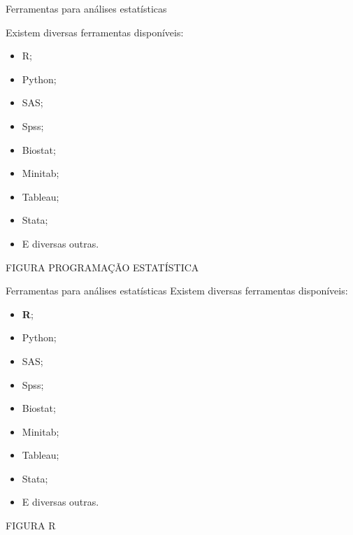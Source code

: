 \documentclass[
  ignorenonframetext,
  serif,
  professionalfont,
  usenames,
  dvipsnames,
  aspectratio = 169]{beamer}
\def\beginAHalfColumn{\begin{minipage}{0.49\textwidth}}%
\def\endColumns{\end{minipage}}%
\begin{document}
\begin{frame}{Ferramentas para análises estatísticas}
\protect\hypertarget{ferramentas-para-anuxe1lises-estatuxedsticas}{}
\beginAHalfColumn

Existem diversas ferramentas disponíveis:

\begin{itemize}
\item
  R;
\item
  Python;
\item
  SAS;
\item
  Spss;
\item
  Biostat;
\item
  Minitab;
\item
  Tableau;
\item
  Stata;
\item
  E diversas outras.
\end{itemize}

\endColumns
\beginAHalfColumn

FIGURA PROGRAMAÇÃO ESTATÍSTICA

\endColumns
\end{frame}

\begin{frame}{Ferramentas para análises estatísticas}
\protect\hypertarget{ferramentas-para-anuxe1lises-estatuxedsticas-1}{}
Existem diversas ferramentas disponíveis:

\beginAHalfColumn

\begin{itemize}
\item
  \textbf{R};
\item
  Python;
\item
  SAS;
\item
  Spss;
\item
  Biostat;
\item
  Minitab;
\item
  Tableau;
\item
  Stata;
\item
  E diversas outras.
\end{itemize}

\endColumns
\beginAHalfColumn

FIGURA R

\endColumns
\end{frame}
\end{document}
